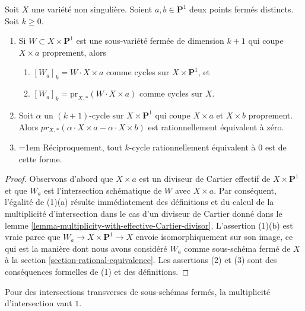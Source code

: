 \begin{lemma}
\label{lemma-rational-equivalence-and-intersection}
Soit $X$ une variété non singulière. Soient $a, b \in \mathbf{P}^1$
deux points fermés distincts. Soit $k \geq 0$.
\begin{enumerate}
\item Si $W \subset X \times \mathbf{P}^1$ est une sous-variété fermée
de dimension $k + 1$ qui coupe $X \times a$ proprement, alors
\begin{enumerate}
\item $[W_a]_k = W \cdot X \times a$ comme cycles sur $X \times \mathbf{P}^1$, et
\item $[W_a]_k = \text{pr}_{X, *}(W \cdot X \times a)$ comme cycles sur $X$.
\end{enumerate}
\item Soit $\alpha$ un $(k + 1)$-cycle sur $X \times \mathbf{P}^1$
qui coupe $X \times a$ et $X \times b$ proprement. Alors
$pr_{X,*}( \alpha \cdot X \times a - \alpha \cdot X \times b)$
est rationnellement équivalent à zéro.
\item {\emergencystretch=1em Réciproquement, tout $k$-cycle rationnellement
équivalent à $0$ est de cette forme.\par}
\end{enumerate}
\end{lemma}

\begin{proof}
Observons d'abord que $X \times a$ est un diviseur de Cartier effectif de
$X \times \mathbf{P}^1$ et que $W_a$ est l'intersection schématique
de $W$ avec $X \times a$. Par conséquent, l'égalité de (1)(a) résulte
immédiatement des définitions et du calcul de la multiplicité d'intersection
dans le cas d'un diviseur de Cartier donné dans le
lemme \ref{lemma-multiplicity-with-effective-Cartier-divisor}.
L'assertion (1)(b) est vraie parce que $W_a \to X \times \mathbf{P}^1 \to X$ envoie
isomorphiquement sur son image, ce qui est la manière dont nous avons considéré $W_a$
comme sous-schéma fermé de $X$ à la section \ref{section-rational-equivalence}.
Les assertions (2) et (3) sont des conséquences formelles de (1) et des définitions.
\end{proof}

\noindent
Pour des intersections transverses de sous-schémas fermés, la multiplicité
d'intersection vaut $1$.

